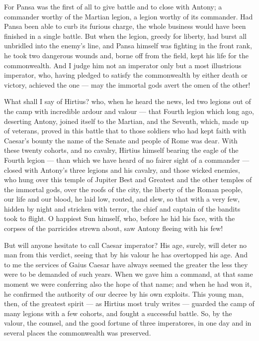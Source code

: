  For Pansa was the first of all to give battle and to close with Antony; a commander worthy of the Martian legion, a legion worthy of its commander. Had Pansa been able to curb its furious charge, the whole business would have been finished in a single battle. But when the legion, greedy for liberty, had burst all unbridled into the enemy's line, and Pansa himself was fighting in the front rank, he took two dangerous wounds and, borne off from the field, kept his life for the commonwealth. And I judge him not an imperator only but a most illustrious imperator, who, having pledged to satisfy the commonwealth by either death or victory, achieved the one --- may the immortal gods avert the omen of the other!

 What shall I say of Hirtius? who, when he heard the news, led two legions out of the camp with incredible ardour and valour --- that Fourth legion which long ago, deserting Antony, joined itself to the Martian, and the Seventh, which, made up of veterans, proved in this battle that to those soldiers who had kept faith with Caesar's bounty the name of the Senate and people of Rome was dear. With these twenty cohorts, and no cavalry, Hirtius himself bearing the eagle of the Fourth legion --- than which we have heard of no fairer sight of a commander --- closed with Antony's three legions and his cavalry, and those wicked enemies, who hung over this temple of Jupiter Best and Greatest and the other temples of the immortal gods, over the roofs of the city, the liberty of the Roman people, our life and our blood, he laid low, routed, and slew, so that with a very few, hidden by night and stricken with terror, the chief and captain of the bandits took to flight. O happiest Sun himself, who, before he hid his face, with the corpses of the parricides strewn about, saw Antony fleeing with his few!

 But will anyone hesitate to call Caesar imperator? His age, surely, will deter no man from this verdict, seeing that by his valour he has overtopped his age. And to me the services of Gaius Caesar have always seemed the greater the less they were to be demanded of such years. When we gave him a command, at that same moment we were conferring also the hope of that name; and when he had won it, he confirmed the authority of our decree by his own exploits. This young man, then, of the greatest spirit --- as Hirtius most truly writes --- guarded the camp of many legions with a few cohorts, and fought a successful battle. So, by the valour, the counsel, and the good fortune of three imperatores, in one day and in several places the commonwealth was preserved.

